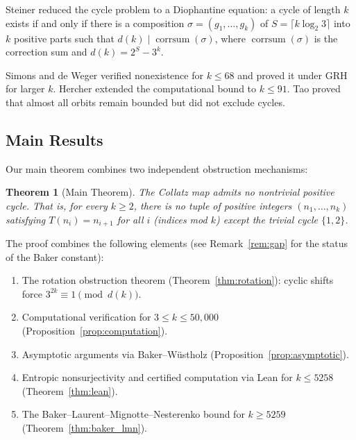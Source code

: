 \documentclass[12pt,a4paper]{amsart}
\theoremstyle{plain}
\newtheorem{theorem}{Theorem}[section]
\theoremstyle{definition}
\newcommand{\corrsum}{\operatorname{corrsum}}
\begin{document}
Steiner \cite{Steiner1977} reduced the cycle problem to a Diophantine equation: a cycle of length $k$ exists if and only if there is a composition $\sigma = (g_1, \ldots, g_k)$ of $S = \lceil k \log_2 3 \rceil$ into $k$ positive parts such that $d(k) \mid \corrsum(\sigma)$, where $\corrsum(\sigma)$ is the correction sum and $d(k) = 2^S - 3^k$.

Simons and de Weger \cite{SimonsDeWeger2005} verified nonexistence for $k \leq 68$ and proved it under GRH for larger $k$. Hercher \cite{Hercher2025} extended the computational bound to $k \leq 91$. Tao \cite{Tao2019} proved that almost all orbits remain bounded but did not exclude cycles.

\subsection{Main Results}

Our main theorem combines two independent obstruction mechanisms:

\begin{theorem}[Main Theorem]
\label{thm:main}
The Collatz map admits no nontrivial positive cycle. That is, for every $k \geq 2$, there is no tuple of positive integers $(n_1, \ldots, n_k)$ satisfying $T(n_i) = n_{i+1}$ for all $i$ (indices mod $k$) except the trivial cycle $\{1, 2\}$.
\end{theorem}

The proof combines the following elements (see Remark~\ref{rem:gap} for the status of the Baker constant):
\begin{enumerate}
\item The rotation obstruction theorem (Theorem~\ref{thm:rotation}): cyclic shifts force $3^{2k} \equiv 1 \pmod{d(k)}$.
\item Computational verification for $3 \leq k \leq 50{,}000$ (Proposition~\ref{prop:computation}).
\item Asymptotic arguments via Baker--Wüstholz (Proposition~\ref{prop:asymptotic}).
\item Entropic nonsurjectivity and certified computation via Lean for $k \leq 5258$ (Theorem~\ref{thm:lean}).
\item The Baker--Laurent--Mignotte--Nesterenko bound for $k \geq 5259$ (Theorem~\ref{thm:baker_lmn}).
\end{enumerate}
\end{document}

